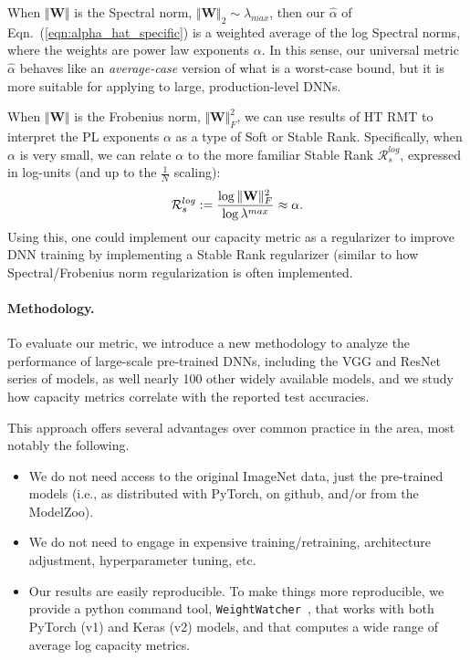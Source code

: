 When $\Vert\mathbf{W}\Vert$ is the Spectral norm, $\Vert\mathbf{W}\Vert_{2}\sim\lambda_{max}$, then our $\hat{\alpha}$ of Eqn.~(\ref{eqn:alpha_hat_specific}) is a weighted average of the log Spectral norms, where the weights are power law exponents $\alpha$. 
In this sense, our universal metric $\hat{\alpha}$ behaves like an \emph{average-case} version of what is a worst-case bound, but it is more suitable for applying to large, production-level DNNs.
 
When $\Vert\mathbf{W}\Vert$ is the Frobenius norm, $\Vert\mathbf{W}\Vert^{2}_{F}$, we can use results of HT RMT to interpret the PL exponents $\alpha$ as a type of Soft or Stable Rank. 
Specifically, when $\alpha$ is very small, we can relate $\alpha$ to the more familiar Stable Rank $\mathcal{R}^{log}_{s}$, expressed in log-units (and up to the $\frac{1}{N}$ scaling):
\vspace{-2mm}
\begin{equation}
\mathcal{R}^{log}_{s}:=\dfrac{\log\Vert\mathbf{W}\Vert^{2}_{F}}{\log\lambda^{max}}  \approx \alpha  .
\vspace{-1mm}
\end{equation}
Using this, one could implement our capacity metric as a regularizer to improve DNN training by implementing a Stable Rank regularizer (similar to how Spectral/Frobenius norm regularization is often implemented.  %


\vspace{-2mm}
\paragraph{Methodology.} 
To evaluate our metric, we introduce a new methodology to analyze the performance of large-scale pre-trained DNNs, including the VGG and ResNet series of models, as well nearly 100 other widely available models, and we study how capacity metrics correlate with the reported test accuracies.
 
This approach offers several advantages over common practice in the area, most notably the following.
\begin{itemize}
\item 
We do not need access to the original ImageNet data, just the pre-trained models (i.e., as distributed with PyTorch, on github, and/or from the ModelZoo).
\item
We do not need to engage in expensive training/retraining, architecture adjustment, hyperparameter tuning, etc.
\item 
Our results are easily reproducible.
To make things more reproducible, we provide a python command tool, \texttt{WeightWatcher}~\cite{weightwatcher_package_justURL}, that works with both PyTorch (v1) and Keras (v2) models, and that computes a wide range of average log capacity metrics.
\end{itemize}
 
